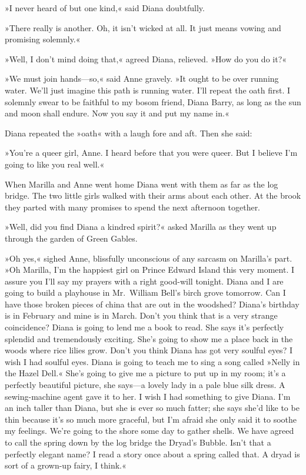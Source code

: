 »I never heard of but one kind,« said Diana doubtfully.

»There really is another. Oh, it isn't wicked at all. It just means vowing and promising solemnly.«

»Well, I don't mind doing that,« agreed Diana, relieved. »How do you do it?«

»We must join hands—so,« said Anne gravely. »It ought to be over running water. We'll just imagine this path is running water. I'll repeat the oath first. I solemnly swear to be faithful to my bosom friend, Diana Barry, as long as the sun and moon shall endure. Now you say it and put my name in.«

Diana repeated the »oath« with a laugh fore and aft. Then she said:

»You're a queer girl, Anne. I heard before that you were queer. But I believe I'm going to like you real well.«

When Marilla and Anne went home Diana went with them as far as the log bridge. The two little girls walked with their arms about each other. At the brook they parted with many promises to spend the next afternoon together.

»Well, did you find Diana a kindred spirit?« asked Marilla as they went up through the garden of Green Gables.

»Oh yes,« sighed Anne, blissfully unconscious of any sarcasm on Marilla's part. »Oh Marilla, I'm the happiest girl on Prince Edward Island this very moment. I assure you I'll say my prayers with a right good-will tonight. Diana and I are going to build a playhouse in Mr.~William Bell's birch grove tomorrow. Can I have those broken pieces of china that are out in the woodshed? Diana's birthday is in February and mine is in March. Don't you think that is a very strange coincidence? Diana is going to lend me a book to read. She says it's perfectly splendid and tremendously exciting. She's going to show me a place back in the woods where rice lilies grow. Don't you think Diana has got very soulful eyes? I wish I had soulful eyes. Diana is going to teach me to sing a song called »Nelly in the Hazel Dell.« She's going to give me a picture to put up in my room; it's a perfectly beautiful picture, she says—a lovely lady in a pale blue silk dress. A sewing-machine agent gave it to her. I wish I had something to give Diana. I'm an inch taller than Diana, but she is ever so much fatter; she says she'd like to be thin because it's so much more graceful, but I'm afraid she only said it to soothe my feelings. We're going to the shore some day to gather shells. We have agreed to call the spring down by the log bridge the Dryad's Bubble. Isn't that a perfectly elegant name? I read a story once about a spring called that. A dryad is sort of a grown-up fairy, I think.«

